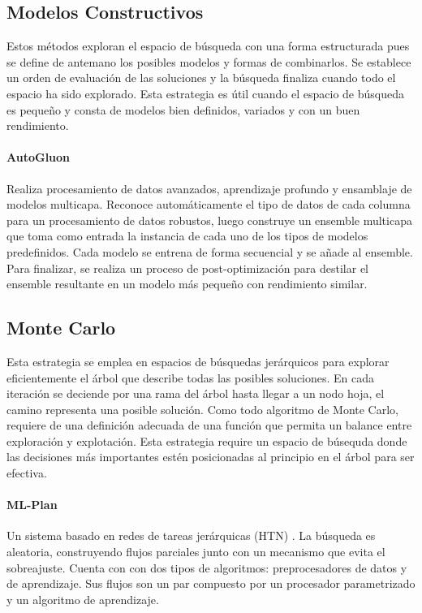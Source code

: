 
\subsection{Modelos Constructivos}
Estos m\'etodos exploran el espacio de b\'usqueda con una forma estructurada pues se define de antemano los posibles modelos y formas de combinarlos. Se establece un orden de evaluaci\'on de las soluciones y la b\'usqueda finaliza cuando todo el espacio ha sido explorado. Esta estrategia es \'util cuando el espacio de b\'usqueda es peque\~no y consta de modelos bien definidos, variados y con un buen rendimiento.

\paragraph{AutoGluon } Realiza procesamiento de datos avanzados, aprendizaje profundo y ensamblaje de modelos multicapa. Reconoce autom\'aticamente el tipo de datos de cada columna para un procesamiento de datos robustos, luego construye un ensemble multicapa  que toma como entrada la instancia de cada uno de los tipos de modelos predefinidos. Cada modelo se entrena de forma secuencial y se a\~nade al ensemble. Para finalizar, se realiza un proceso de post-optimizaci\'on para destilar el ensemble resultante en un modelo m\'as peque\~no con rendimiento similar.

\subsection{Monte Carlo}
 Esta estrategia se emplea en espacios de b\'usquedas jer\'arquicos para explorar eficientemente el \'arbol que describe todas las  posibles soluciones. En cada iteraci\'on se deciende por una rama del \'arbol hasta llegar a un nodo hoja, el camino representa una posible soluci\'on. Como todo algoritmo de Monte Carlo, requiere de una definici\'on adecuada de una funci\'on que permita un balance entre exploraci\'on y explotaci\'on. Esta estrategia require un espacio de b\'usequda donde las decisiones m\'as importantes est\'en posicionadas al principio en el \'arbol para ser efectiva.

 \paragraph{ML-Plan } Un sistema basado en redes de tareas jer\'arquicas (HTN) . La b\'usqueda es aleatoria, construyendo flujos parciales junto con un mecanismo que evita el sobreajuste. Cuenta con con dos tipos de algoritmos:  preprocesadores de datos y de aprendizaje. Sus flujos son un par compuesto por un procesador parametrizado y un algoritmo de aprendizaje.
    


